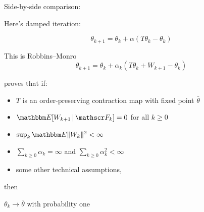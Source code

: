 \documentclass[xcolor=dvipsnames]{beamer}  %
\renewcommand{\geq}{\geqslant}
\newcommand{\1}{\mathbbm 1}
\newcommand{\given}{\, | \,}
\newcommand{\EE}{\mathbbm E}
\newcommand{\fF}{\mathscr F}
\begin{document}
\begin{frame}
    
    Side-by-side comparison:

    \vspace{1em}

    Here's damped iteration:

    \begin{equation*}
        \theta_{k+1} = \theta_k + \alpha (T \theta_k - \theta_k)
    \end{equation*}

    \vspace{1em}
    \vspace{1em}

    This is Robbins--Monro 
    \begin{equation*}
        \theta_{k+1} 
        = \theta_k + \alpha_k ( T \theta_k + W_{k+1} - \theta_k )
    \end{equation*}

\end{frame}


\begin{frame}
    
    \cite{tsitsiklis1994asynchronous} proves that if:
    \begin{itemize}
        \item $T$ is an order-preserving contraction map with fixed
            point $\bar \theta$
            \vspace{0.5em}
        \item $\EE [W_{k+1} \given \fF_k] = 0$ for all $k \geq 0$
            \vspace{0.5em}
        \item $\sup_k \EE \| W_k \|^2 < \infty$ 
            \vspace{0.5em}
        \item $\sum_{k \geq 0} \alpha_k = \infty$ and $\sum_{k \geq 0} \alpha_k^2 < \infty$
            \vspace{0.5em}
        \item some other technical assumptions,
    \end{itemize}
    then 
    \begin{center}
        $\theta_k \to \bar \theta$ with probability one
    \end{center}

\end{frame}
\end{document}
